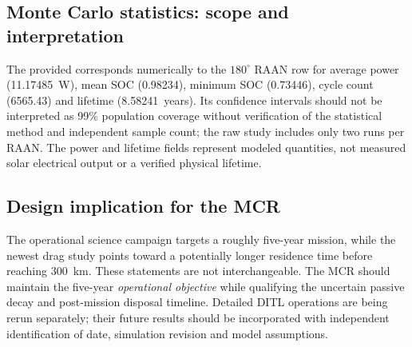 \subsection{Monte Carlo statistics: scope and interpretation}
The provided  corresponds numerically to the $180^\circ$ RAAN row for average power (11.17485~W), mean SOC (0.98234), minimum SOC (0.73446), cycle count (6565.43) and lifetime (8.58241~years). Its confidence intervals should not be interpreted as 99\% population coverage without verification of the statistical method and independent sample count; the raw study includes only two runs per RAAN. The power and lifetime fields represent modeled quantities, not measured solar electrical output or a verified physical lifetime.

\subsection{Design implication for the MCR}
The operational science campaign targets a roughly five-year mission, while the newest drag study points toward a potentially longer residence time before reaching 300~km. These statements are not interchangeable. The MCR should maintain the five-year \emph{operational objective} while qualifying the uncertain passive decay and post-mission disposal timeline. Detailed DITL operations are being rerun separately; their future results should be incorporated with independent identification of date, simulation revision and model assumptions.
